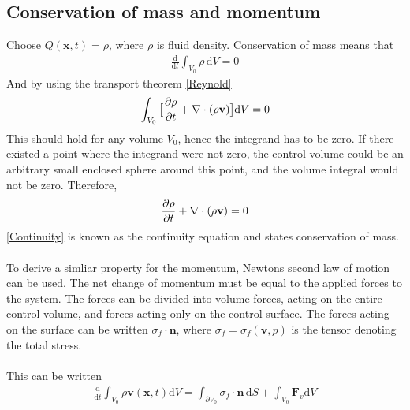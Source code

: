 \subsection{Conservation of mass and momentum}
Choose $Q(\mathbf{x},t) = \rho$, where $\rho$ is fluid density. Conservation of mass means that
\begin{align*} 
\frac{\mathrm{d}}{\mathrm{d}t} \int_{V_0} \rho \, \mathrm{d}V = 0
\end{align*}
And by using the transport theorem \eqref{Reynold}
\begin{align}
\int_{V_0} \big{[}\frac{\partial \rho}{\partial t} + \nabla \cdot (\rho \mathbf{v}) \big{]}\mathrm{d}V = 0
\end{align}
This should hold for any volume $V_0$, hence the integrand has to be zero. If there existed a point where the integrand were not zero, the control volume could be an arbitrary small enclosed sphere around this point, and the volume integral would not be zero. Therefore, 
\begin{align} 
\frac{\partial \rho}{\partial t} + \nabla \cdot (\rho \mathbf{v}) = 0 \label{Continuity}
\end{align}
\eqref{Continuity} is known as the continuity equation and states conservation of mass. 
\\
\\
To derive a simliar property for the momentum, Newtons second law of motion can be used. The net change of momentum must be equal to the applied forces to the system. The forces can be divided into volume forces, acting on the entire control volume, and forces acting only on the control surface. The forces acting on the surface can be written $\sigma_f \cdot \mathbf{n}$, where $\sigma_f = \sigma_f(\mathbf{v}, p)$ is the tensor denoting the total stress. \\
\\
This can be written
\begin{align*} \frac{\mathrm{d}}{\mathrm{d}t} \int_{V_0} \rho \mathbf{v}(\mathbf{x},t) \mathrm{d}V = \int_{\partial V_0}\sigma_f \cdot \mathbf{n} \,\mathrm{d}S + \int_{V_0} \mathbf{F}_v \mathrm{d}V
\end{align*}

